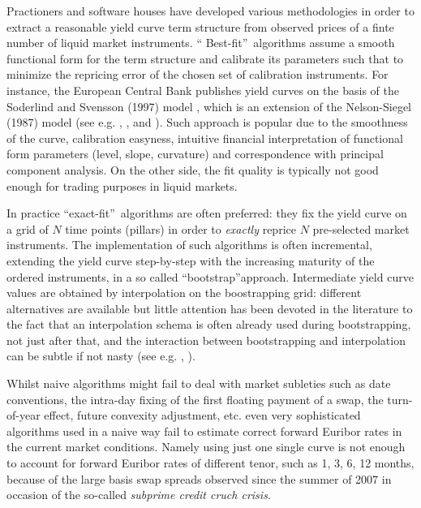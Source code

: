 \documentclass[11pt,reqno]{amsart}
\begin{document}
Practioners and software houses have developed various methodologies in
order to extract a reasonable yield curve term structure from observed
prices of a finte number of liquid market instruments. \textquotedblleft
Best-fit\textquotedblright\ algorithms assume a smooth functional form for
the term structure and calibrate its parameters such that to minimize the
repricing error of the chosen set of calibration instruments. For instance,
the European Central Bank publishes yield curves on the basis of the
Soderlind and Svensson (1997) model \cite{SoderlindSwensson1997}, which is
an extension of the Nelson-Siegel (1987) model (see e.g. \cite{NelsonSiegel}%
, \cite{Diament}, \cite{ChristensenEtAl2007} and \cite{Coroneo2008}). Such
approach is popular due to the smoothness of the curve, calibration
easyness, intuitive financial interpretation of functional form parameters
(level, slope, curvature) and correspondence with principal component
analysis. On the other side, the fit quality is typically not good enough
for trading purposes in liquid markets.

In practice
\textquotedblleft exact-fit\textquotedblright\ algorithms are often preferred:
they fix the
yield curve on a grid of $N$ time points (pillars) in order to \emph{exactly}
reprice $N$ pre-selected market instruments. The implementation of such
algorithms is often incremental, extending the yield curve step-by-step with
the increasing maturity of the ordered instruments, in a so
called \textquotedblleft bootstrap\textquotedblright approach. Intermediate yield
curve values are obtained by interpolation on the boostrapping grid:
different alternatives are available but little attention has been devoted
in the literature to the fact that an interpolation schema is often already
used during bootstrapping, not just after that, and the interaction between
bootstrapping and interpolation can be subtle if not nasty (see e.g. \cite%
{HaganWest2006}, \cite{HaganWest2008}).

Whilst naive algorithms might fail to deal with market
subleties such as date conventions,
the intra-day fixing of the first floating payment of a swap,
the turn-of-year effect, future convexity adjustment, etc.
even very sophisticated algorithms used in a naive way
fail to estimate correct forward Euribor rates in the current
market conditions. Namely using just one single curve is
not enough to account for forward Euribor rates of different tenor,
such as 1, 3, 6, 12 months, because of the large
basis swap spreads observed since the summer of 2007 in occasion
of the so-called {\it subprime credit cruch crisis.}
\end{document}

